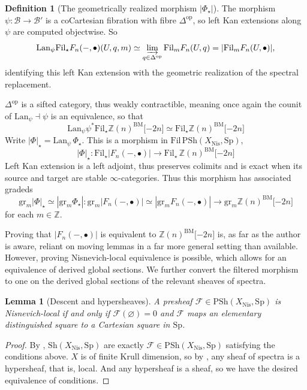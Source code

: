 \documentclass[11pt, twoside]{article}
\numberwithin{equation}{section}
\newtheorem{lemma}[equation]{Lemma}
\theoremstyle{definition}
\newtheorem{definition}[equation]{Definition}
\newcommand{\bb}[1]{\mathbb{#1}}
\newcommand{\colim}{\varinjlim}
\newcommand{\fil}{\mathrm{Fil}}
\newcommand{\gr}{\mathrm{gr}}
\newcommand{\Sp}{\mathrm{Sp}}
\newcommand{\bm}{\mathrm{BM}}
\newcommand{\psh}{\mathrm{PSh}}
\newcommand{\shv}{\mathrm{Sh}}
\newcommand{\lan}{\mathrm{Lan}}
\newcommand{\nis}{\mathrm{Nis}}
\newcommand{\op}{\mathrm{op}}
\begin{document}
\begin{definition}[The geometrically realized morphism \(|\Phi_\star|\)]
The morphism \(\psi \colon \mathcal{B} \to \mathcal{B}'\) is a coCartesian fibration with fibre \(\Delta^\op\), so left Kan extensions along \(\psi\) are computed objectwise. So 
\[\lan_\psi \fil_\star F_n( -, \bullet)(U, q, m) \simeq \colim_{q \in \Delta^\op} \fil_m F_n(U, q) = |\fil_m F_n(U, \bullet)|,\]
identifying this left Kan extension with the geometric realization of the spectral replacement.

\(\Delta^\op\) is a sifted category, thus weakly contractible, meaning once again the counit of \(\lan_\psi \dashv \psi\) is an equivalence, so that 
\[\lan_\psi \psi^*\fil_\star \bb{Z}(n)^\bm \lbrack -2n \rbrack \simeq \fil_\star \bb{Z}(n)^\bm \lbrack - 2n\rbrack\]
Write \(|\Phi|_\star = \lan_\psi \, \Phi_\star\). This is a morphism in \(\fil \, \psh(X_\nis, \Sp)\), 
\[|\Phi|_\star \colon \fil_\star |F_n( -, \bullet)| \to \fil_\star \, \bb{Z}(n)^\bm\lbrack -2n \rbrack\]
Left Kan extension is a left adjoint, thus preserves colimits and is exact when its source and target are stable \(\infty\)-categories. Thus this morphism has associated gradeds 
\[\gr_m |\Phi|_\star \simeq |\gr_m \Phi_\star| \colon \gr_m |F_n( -, \bullet)| \simeq |\gr_m F_n( -, \bullet)| \to \gr_m \bb{Z}(n)^\bm \lbrack -2n \rbrack\]
for each \(m \in \bb{Z}\).
\end{definition}

Proving that \(|F_n( -, \bullet)|\) is equivalent to \(\bb{Z}(n)^\bm\lbrack -2n \rbrack\) is, as far as the author is aware, reliant on moving lemmas in a far more general setting than available. However, proving Nisnevich-local equivalence is possible, which allows for an equivalence of derived global sections. We further convert the filtered morphism to one on the derived global sections of the relevant sheaves of spectra.

\begin{lemma}[Descent and hypersheaves]
A presheaf \(\mathcal{F} \in \psh(X_\nis, \Sp)\) is Nisnevich-local if and only if \(\mathcal{F}(\varnothing) = 0\) and \(\mathcal{F}\) maps an elementary distinguished square to a Cartesian square in \(\Sp\).
\end{lemma}

\begin{proof}
By \cite[Proposition 2.8.1 (1)]{BEM}, \(\shv(X_\nis, \Sp)\) are exactly \(\mathcal{F} \in \psh(X_\nis, \Sp)\) satisfying the conditions above. \(X\) is of finite Krull dimension, so by \cite[Theorem 1.7]{CM}, any sheaf of spectra is a hypersheaf, that is, local. And any hypersheaf is a sheaf, so we have the desired equivalence of conditions.
\end{proof}
\end{document}
